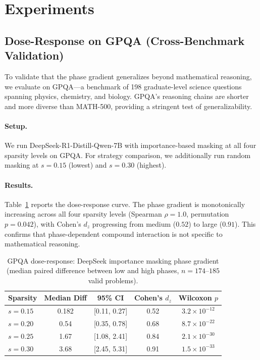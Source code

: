 \documentclass[11pt]{article}
\begin{document}
\section{Experiments}

\subsection{Dose-Response on GPQA (Cross-Benchmark Validation)}
\label{sec:gpqa}

To validate that the phase gradient generalizes beyond mathematical reasoning, we evaluate on GPQA---a benchmark of 198 graduate-level science questions spanning physics, chemistry, and biology. GPQA's reasoning chains are shorter and more diverse than MATH-500, providing a stringent test of generalizability.

\paragraph{Setup.} We run DeepSeek-R1-Distill-Qwen-7B with importance-based masking at all four sparsity levels on GPQA. For strategy comparison, we additionally run random masking at $s=0.15$ (lowest) and $s=0.30$ (highest).

\paragraph{Results.} Table~\ref{tab:gpqa_dose} reports the dose-response curve. The phase gradient is monotonically increasing across all four sparsity levels (Spearman $\rho = 1.0$, permutation $p = 0.042$), with Cohen's $d_z$ progressing from medium ($0.52$) to large ($0.91$). This confirms that phase-dependent compound interaction is not specific to mathematical reasoning.

\begin{table}[t]
\centering
\caption{GPQA dose-response: DeepSeek importance masking phase gradient (median paired difference between low and high phases, $n=174$--$185$ valid problems).}
\label{tab:gpqa_dose}
\begin{tabular}{lcccc}
\toprule
Sparsity & Median Diff & 95\% CI & Cohen's $d_z$ & Wilcoxon $p$ \\
\midrule
$s=0.15$ & 0.182 & [0.11, 0.27] & 0.52 & $3.2 \times 10^{-12}$ \\
$s=0.20$ & 0.54 & [0.35, 0.78] & 0.68 & $8.7 \times 10^{-22}$ \\
$s=0.25$ & 1.67 & [1.08, 2.41] & 0.84 & $2.1 \times 10^{-30}$ \\
$s=0.30$ & 3.68 & [2.45, 5.31] & 0.91 & $1.5 \times 10^{-33}$ \\
\bottomrule
\end{tabular}
\end{table}
\end{document}
